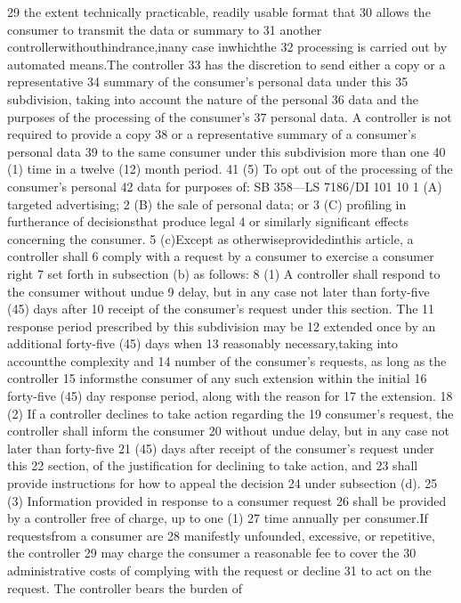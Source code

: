 29 the extent technically practicable, readily usable format that
30 allows the consumer to transmit the data or summary to
31 another controllerwithouthindrance,inany case inwhichthe
32 processing is carried out by automated means.The controller
33 has the discretion to send either a copy or a representative
34 summary of the consumer's personal data under this
35 subdivision, taking into account the nature of the personal
36 data and the purposes of the processing of the consumer's
37 personal data. A controller is not required to provide a copy
38 or a representative summary of a consumer's personal data
39 to the same consumer under this subdivision more than one
40 (1) time in a twelve (12) month period.
41 (5) To opt out of the processing of the consumer's personal
42 data for purposes of:
SB 358—LS 7186/DI 101
10
1 (A) targeted advertising;
2 (B) the sale of personal data; or
3 (C) profiling in furtherance of decisionsthat produce legal
4 or similarly significant effects concerning the consumer.
5 (c)Except as otherwiseprovidedinthis article, a controller shall
6 comply with a request by a consumer to exercise a consumer right
7 set forth in subsection (b) as follows:
8 (1) A controller shall respond to the consumer without undue
9 delay, but in any case not later than forty-five (45) days after
10 receipt of the consumer's request under this section. The
11 response period prescribed by this subdivision may be
12 extended once by an additional forty-five (45) days when
13 reasonably necessary,taking into accountthe complexity and
14 number of the consumer's requests, as long as the controller
15 informsthe consumer of any such extension within the initial
16 forty-five (45) day response period, along with the reason for
17 the extension.
18 (2) If a controller declines to take action regarding the
19 consumer's request, the controller shall inform the consumer
20 without undue delay, but in any case not later than forty-five
21 (45) days after receipt of the consumer's request under this
22 section, of the justification for declining to take action, and
23 shall provide instructions for how to appeal the decision
24 under subsection (d).
25 (3) Information provided in response to a consumer request
26 shall be provided by a controller free of charge, up to one (1)
27 time annually per consumer.If requestsfrom a consumer are
28 manifestly unfounded, excessive, or repetitive, the controller
29 may charge the consumer a reasonable fee to cover the
30 administrative costs of complying with the request or decline
31 to act on the request. The controller bears the burden of
